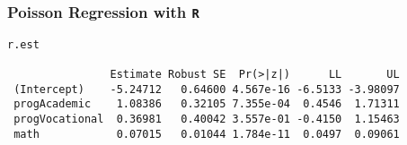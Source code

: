 \documentclass[00-GLMregslides.tex]{subfiles}
\begin{document}
\begin{frame}[fragile]

\frametitle{Poisson Regression with \texttt{R}}
\large 

\begin{framed}
\begin{verbatim}
r.est
 
                Estimate Robust SE  Pr(>|z|)      LL       UL
 (Intercept)    -5.24712   0.64600 4.567e-16 -6.5133 -3.98097
 progAcademic    1.08386   0.32105 7.355e-04  0.4546  1.71311
 progVocational  0.36981   0.40042 3.557e-01 -0.4150  1.15463
 math            0.07015   0.01044 1.784e-11  0.0497  0.09061
\end{verbatim}
\end{framed}

\end{frame}

\end{document}
